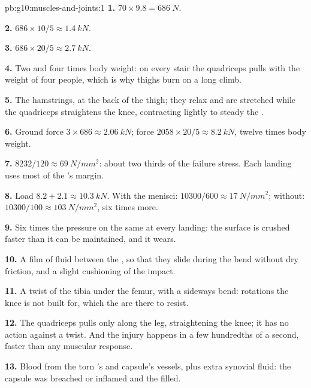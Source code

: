 \begin{solution}{pb:g10:muscles-and-joints:1}
\textbf{1.} $70 \times 9.8 = \qty{686}{N}$.

\textbf{2.} $686 \times 10/5 \approx \qty{1.4}{kN}$.

\textbf{3.} $686 \times 20/5 \approx \qty{2.7}{kN}$.

\textbf{4.} Two and four times body weight: on every stair the
quadriceps pulls with the weight of four people, which is why thighs
burn on a long climb.

\textbf{5.} The hamstrings, at the back of the thigh; they relax and
are stretched while the quadriceps straightens the knee, contracting
lightly to steady the .

\textbf{6.} Ground force $3 \times 686 \approx \qty{2.06}{kN}$; 
force $2058 \times 20/5 \approx \qty{8.2}{kN}$, twelve times body
weight.

\textbf{7.} $8232/120 \approx \qty{69}{N/mm^2}$: about two thirds of
the failure stress. Each landing uses most of the 's margin.

\textbf{8.} Load $8.2 + 2.1 \approx \qty{10.3}{kN}$. With the menisci:
$10300/600 \approx \qty{17}{N/mm^2}$; without: $10300/100 \approx
\qty{103}{N/mm^2}$, six times more.

\textbf{9.} Six times the pressure on the same  at every
landing: the surface is crushed faster than it can be maintained, and
it wears.

\textbf{10.} A film of fluid between the , so that they
slide during the bend without dry friction, and a slight cushioning of
the impact.

\textbf{11.} A twist of the tibia under the femur, with a sideways
bend: rotations the knee is not built for, which the  are
there to resist.

\textbf{12.} The quadriceps pulls only along the leg, straightening the
knee; it has no action against a twist. And the injury happens in a
few hundredths of a second, faster than any muscular response.

\textbf{13.} Blood from the torn 's and capsule's vessels,
plus extra synovial fluid: the capsule was breached or inflamed and
the  filled.


\end{solution}
